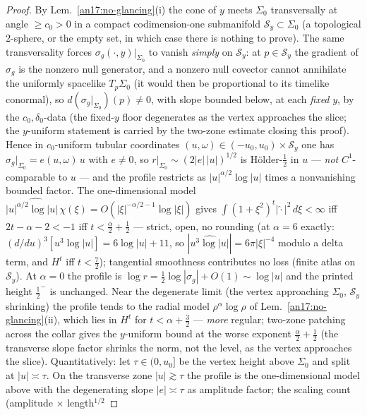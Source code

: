 \begin{proof}
By Lem.~\ref{an17:no-glancing}(i) the cone of $y$ meets $\Sigma_0$
transversally at angle $\ge c_0>0$ in a compact codimension-one submanifold
$\mathcal S_y\subset\Sigma_0$ (a topological $2$-sphere, or the empty set, in
which case there is nothing to prove). The same transversality forces
$\sigma_g(\cdot,y)|_{\Sigma_0}$ to vanish \emph{simply} on $\mathcal S_y$: at
$p\in\mathcal S_y$ the gradient of $\sigma_g$ is the nonzero null generator,
and a nonzero null covector cannot annihilate the uniformly spacelike
$T_p\Sigma_0$ (it would then be proportional to its timelike conormal), so
$d(\sigma_g|_{\Sigma_0})(p)\neq0$, with slope bounded below, at each
\emph{fixed} $y$, by the $c_0,\delta_0$-data (the fixed-$y$ floor
degenerates as the vertex approaches the slice; the $y$-uniform statement
is carried by the two-zone estimate closing this proof). Hence in
$c_0$-uniform tubular coordinates
$(u,\omega)\in(-u_0,u_0)\times\mathcal S_y$ one has
$\sigma_g|_{\Sigma_0}=e(u,\omega)\,u$ with $e\neq0$, so
$r|_{\Sigma_0}\sim(2|e|\,|u|)^{1/2}$ is H\"older-$\tfrac12$ in $u$ ---
\emph{not} $C^1$-comparable to $u$ --- and the profile restricts as
$|u|^{\alpha/2}\log|u|$ times a nonvanishing bounded factor. The
one-dimensional model
$\widehat{|u|^{\alpha/2}\log|u|\,\chi}(\xi)=O(|\xi|^{-\alpha/2-1}\log|\xi|)$
gives $\int(1+\xi^2)^{t}|\widehat{\cdot}|^2\,d\xi<\infty$ iff
$2t-\alpha-2<-1$ iff $t<\tfrac\alpha2+\tfrac12$ --- strict, open, no rounding
(at $\alpha=6$ exactly: $(d/du)^3[u^3\log|u|]=6\log|u|+11$, so
$|\widehat{u^3\log|u|}|=6\pi|\xi|^{-4}$ modulo a delta term, and $H^t$ iff
$t<\tfrac72$); tangential smoothness contributes no loss (finite atlas on
$\mathcal S_y$). At $\alpha=0$ the profile is
$\log r=\tfrac12\log|\sigma_g|+O(1)\sim\log|u|$ and the printed height
$\tfrac12^-$ is unchanged. Near the degenerate limit (the vertex approaching
$\Sigma_0$, $\mathcal S_y$ shrinking) the profile tends to the radial model
$\rho^\alpha\log\rho$ of Lem.~\ref{an17:no-glancing}(ii), which lies in
$H^{t}$ for $t<\alpha+\tfrac32$ --- \emph{more} regular; two-zone patching
across the collar gives the $y$-uniform bound at the worse exponent
$\tfrac\alpha2+\tfrac12$ (the transverse slope factor shrinks the norm, not
the level, as the vertex approaches the slice). Quantitatively: let
$\tau\in(0,u_0]$ be the vertex height above $\Sigma_0$ and split at
$|u|\asymp\tau$. On the transverse zone $|u|\gtrsim\tau$ the profile is the
one-dimensional model above with the degenerating slope $|e|\asymp\tau$ as
amplitude factor; the scaling count (amplitude $\times$ length$^{1/2}$

\end{proof}
